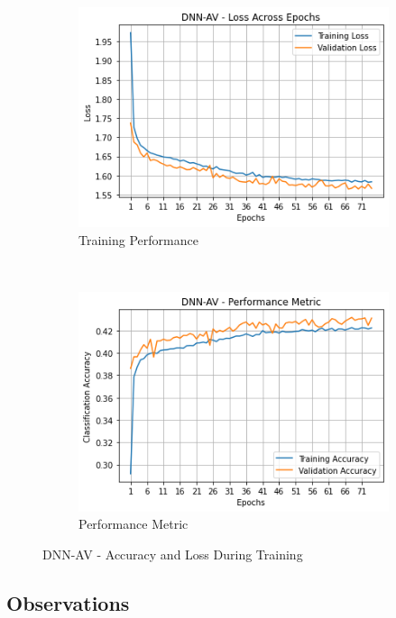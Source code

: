 \documentclass[journal,onecolumn]{IEEEtran}
\begin{document}
\begin{figure}[h]
    \centering
    \begin{subfigure}[b]{0.4\textwidth}
        \centering
        \includegraphics[scale=0.5]{dnnavPerf}
        \caption{Training Performance}
    \end{subfigure}%
    ~ 
    \begin{subfigure}[b]{0.4\textwidth}
        \centering
        \includegraphics[scale=0.5]{dnnavPerfMet}
        \caption{Performance Metric}
    \end{subfigure}
    \caption{DNN-AV - Accuracy and Loss During Training}
    \label{fig:performanceDNN}
\end{figure}

\subsection{Observations}
\end{document}

